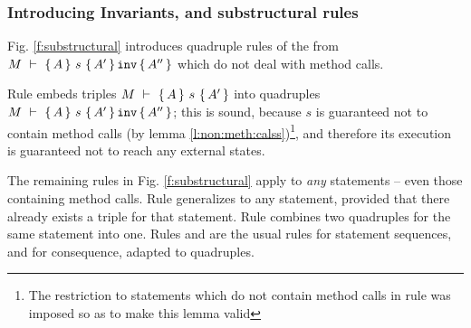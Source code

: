 {\subsubsection{Introducing Invariants, and substructural rules}
Fig. \ref{f:substructural} introduces quadruple rules of the from ${M\ \vdash\ \{\,A\, \} \ s\  \{\,A'\, \}\, {\texttt{inv}}\, \{\, A'' \, \} }$ which do not deal with method calls.

Rule {} embeds  triples  ${\hproves{M}  {A} {\ s\ }{A'} }$  into quadruples ${M\ \vdash\ \{\,A\, \} \ s\  \{\,A'\, \}\, {\texttt{inv}}\, \{\, A'' \, \} }$; this is sound, because $s$ is guaranteed not to contain method calls (by lemma \ref{l:non:meth:calss})\footnote{The restriction to statements which do not contain method calls in rule {} was imposed so as to make this lemma valid}, and therefore its execution is guaranteed not to reach any external states.

 
The remaining rules in Fig. \ref{f:substructural} apply to \emph{any} statements -- even those containing method calls.
 Rule {} generalizes {} to any statement, provided that  there already exists a triple for that statement.
Rule {} combines two quadruples for the same statement into one.
Rules  {} and  {} are the usual rules for statement sequences, and for consequence, adapted to quadruples.


}

